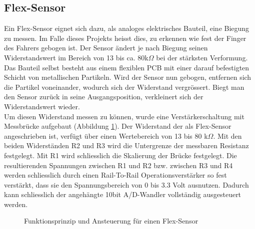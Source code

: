 \subsection{Flex-Sensor}
\label{tGl_FlexSensor}
Ein Flex-Sensor eignet sich dazu, als analoges elektrisches Bauteil, eine Biegung zu messen. Im Falle dieses Projekts heisst dies, zu erkennen wie fest der Finger des Fahrers gebogen ist. 
Der Sensor ändert je nach Biegung seinen Widerstandswert im Bereich von 13 bis ca. 80k$\Omega$ bei der stärksten Verformung. Das Bauteil selbst besteht aus einem flexiblen PCB mit einer darauf befestigten Schicht von metallischen Partikeln. Wird der Sensor nun gebogen, entfernen sich die Partikel voneinander, wodurch sich der Widerstand vergrössert. Biegt man den Sensor zurück in seine Ausgangsposition, verkleinert sich der Widerstandswert wieder.
\\
Um diesen Widerstand messen zu können, wurde eine Verstärkerschaltung mit Messbrücke aufgebaut (Abbildung \ref{fig:gl_Flex-Sensor}). Der Widerstand der als Flex-Sensor angeschrieben ist, verfügt über einen Wertebereich von 13 bis 80 k$\Omega$. Mit den beiden Widerständen R2 und R3 wird die Untergrenze der messbaren Resistanz festgelegt. Mit R1 wird schliesslich die Skalierung der Brücke festgelegt. Die resultierenden Spannungen zwischen R1 und R2 bzw. zwischen R3 und R4 werden schliesslich durch einen Rail-To-Rail Operationsverstärker so fest verstärkt, dass sie den Spannungsbereich von 0 bis 3.3 Volt ausnutzen. Dadurch kann schliesslich der
angehängte 10bit A/D-Wandler vollständig ausgesteuert werden.
\begin{figure} [H]
	\centering

\caption[FlexSensor]{Funktionsprinzip und Ansteuerung für einen Flex-Sensor}
\label{fig:gl_Flex-Sensor}
\end{figure}

